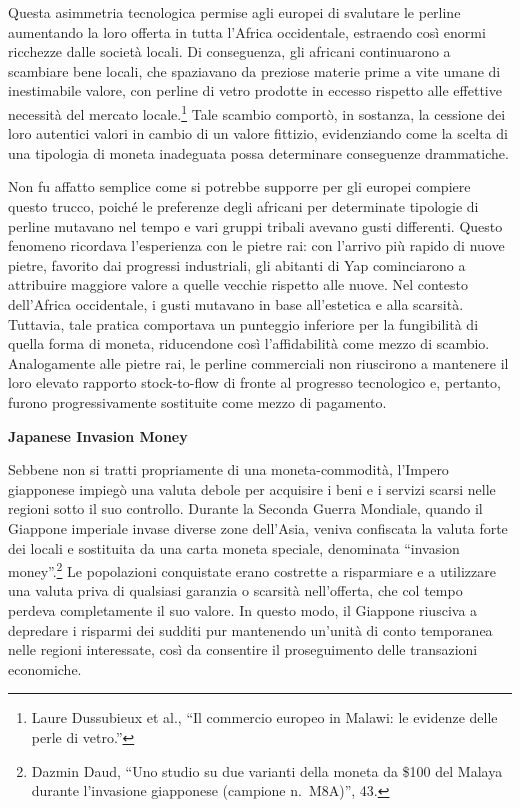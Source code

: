 \documentclass[
  a5paper,
  smalldemyvopaper,10pt,twoside,onecolumn,openright,extrafontsizes,hidelinks]{memoir}
\begin{document}
Questa asimmetria tecnologica permise agli europei di svalutare le
perline aumentando la loro offerta in tutta l'Africa occidentale,
estraendo così enormi ricchezze dalle società locali. Di conseguenza,
gli africani continuarono a scambiare bene locali, che spaziavano da
preziose materie prime a vite umane di inestimabile valore, con perline
di vetro prodotte in eccesso rispetto alle effettive necessità del
mercato locale.\footnote{Laure Dussubieux et al., ``Il commercio europeo
  in Malawi: le evidenze delle perle di vetro.''} Tale scambio comportò,
in sostanza, la cessione dei loro autentici valori in cambio di un
valore fittizio, evidenziando come la scelta di una tipologia di moneta
inadeguata possa determinare conseguenze drammatiche.

Non fu affatto semplice come si potrebbe supporre per gli europei
compiere questo trucco, poiché le preferenze degli africani per
determinate tipologie di perline mutavano nel tempo e vari gruppi
tribali avevano gusti differenti. Questo fenomeno ricordava l'esperienza
con le pietre rai: con l'arrivo più rapido di nuove pietre, favorito dai
progressi industriali, gli abitanti di Yap cominciarono a attribuire
maggiore valore a quelle vecchie rispetto alle nuove. Nel contesto
dell'Africa occidentale, i gusti mutavano in base all'estetica e alla
scarsità. Tuttavia, tale pratica comportava un punteggio inferiore per
la fungibilità di quella forma di moneta, riducendone così
l'affidabilità come mezzo di scambio. Analogamente alle pietre rai, le
perline commerciali non riuscirono a mantenere il loro elevato rapporto
stock-to-flow di fronte al progresso tecnologico e, pertanto, furono
progressivamente sostituite come mezzo di pagamento.

\textbf{Japanese Invasion Money}

Sebbene non si tratti propriamente di una moneta-commodità, l'Impero
giapponese impiegò una valuta debole per acquisire i beni e i servizi
scarsi nelle regioni sotto il suo controllo. Durante la Seconda Guerra
Mondiale, quando il Giappone imperiale invase diverse zone dell'Asia,
veniva confiscata la valuta forte dei locali e sostituita da una carta
moneta speciale, denominata ``invasion money''.\footnote{Dazmin Daud,
  ``Uno studio su due varianti della moneta da \$100 del Malaya durante
  l'invasione giapponese (campione n.~M8A)'', 43.} Le popolazioni
conquistate erano costrette a risparmiare e a utilizzare una valuta
priva di qualsiasi garanzia o scarsità nell'offerta, che col tempo
perdeva completamente il suo valore. In questo modo, il Giappone
riusciva a depredare i risparmi dei sudditi pur mantenendo un'unità di
conto temporanea nelle regioni interessate, così da consentire il
proseguimento delle transazioni economiche.
\end{document}

